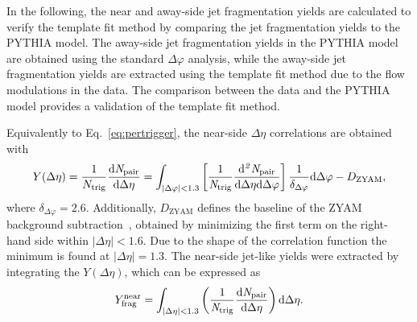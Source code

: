 \begin{table}[!b]
\caption{The scale factor $F$ for various multiplicity intervals is shown for pp collisions (top) and p--Pb collisions (bottom), with 1~$<\it{p}{\rm{T,trig}}<$~2~GeV/$c$ and 1~$<\it{p}{\rm{T,assoc}}<$~4~GeV/$c$. Note that only statistical uncertainties are reported in the table. The systematic uncertainty for $F$ is 3.8\%, which is the same for both collision systems and multiplicity intervals.}
\centering
{}
\label{tab:FpppPb}
\end{table}

In the following, the near and away-side jet fragmentation yields are calculated to verify the template fit method by comparing the jet fragmentation yields to the PYTHIA model. The away-side jet fragmentation yields in the PYTHIA model are obtained using the standard $\Delta\varphi$ analysis, while the away-side jet fragmentation yields are extracted using the template fit method due to the flow modulations in the data. The comparison between the data and the PYTHIA model provides a validation of the template fit method. 

Equivalently to Eq.~\eqref{eq:pertrigger}, the near-side $\Delta\eta$ correlations are obtained with
\begin{equation}
Y(\Delta\eta)=\frac{1}{N_{\rm{trig}}} \frac{ \rm{d}\it{}N_{\rm{pair}} }{ \rm{d}\Delta\eta }=\int_{|\Delta\varphi|<1.3}\left[ \frac{1}{\it{N}_{\rm{trig}}} \frac{ \rm{d}\it{}^{2} N_{\rm{pair}} }{ \rm{d}\Delta\eta d\Delta\varphi} \right]\dfrac{1}{\delta_{\Delta\varphi}} {\rm{d}}\Delta \varphi - D_\mathrm{ZYAM},
\label{eq:deltaetacorr}
\end{equation}
where $\delta_{\Delta\varphi}=2.6$. Additionally, $D_\mathrm{ZYAM}$ defines the baseline of the ZYAM background subtraction~\cite{Ajitanand:2005jj}, obtained by minimizing the first term on the right-hand side within $|\Delta\eta|<1.6$. Due to the shape of the correlation function the minimum is found at $|\Delta\eta|=1.3$.
The near-side jet-like yields were extracted by integrating the $Y(\Delta\eta)$, which can be expressed as
\begin{eqnarray}
Y^\mathrm{near}_{\rm{frag}} = \int_{|\Delta \eta|<1.3} \left( \frac{1}{\it{N}_{\rm{trig}}} \frac{ \rm{d}\it{}N_{\rm{pair}} }{ \rm{d}\Delta\eta } \right) \rm{d} \Delta\eta.
\label{eq:Ynear}
\end{eqnarray}

